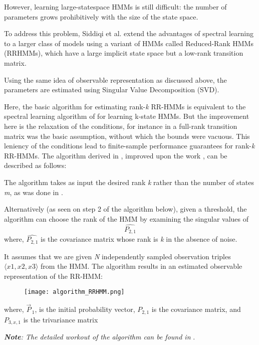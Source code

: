 However, learning large-statespace HMMs is still difficult: the number of parameters
grows prohibitively with the size of the state space.

To address this problem, Siddiqi et al.\cite{ref7} extend the advantages of spectral
learning to a larger class of models using a variant of HMMs called Reduced-Rank HMMs (RRHMMs), which have a large implicit state space but a low-rank transition matrix.

Using the same idea of observable representation as discussed above, the parameters are estimated using Singular Value Decomposition (SVD).

Here, the basic algorithm for estimating rank-\textit{k} RR-HMMs is
equivalent to the spectral learning algorithm of \cite{ref2} for learning k-state HMMs. But the improvement here is the relaxation of the conditions, for instance in \cite{ref2} a full-rank transition matrix was the basic assumption, without which the bounds were vacuous. This leniency of the conditions lead to finite-sample performance guarantees for rank-\textit{k} RR-HMMs.
\newline
\newline
The algorithm derived in \cite{ref7}, improved upon the work \cite{ref2}, can be described as follows:

The algorithm takes as input the desired rank \textit{k}
rather than the number of states \textit{m}, as was done in \cite{ref2}.

Alternatively (as seen on step 2 of the algorithm below), given a threshold, the algorithm can choose the rank of the HMM by examining the singular values of \[\widehat{{P}_{2,1}}\]
 \quad where, $ \widehat{{P}_{2,1}} $ is the covariance matrix whose rank is \textit{k} in the absence of noise. 

It assumes that we are given \textit{N} independently sampled
observation triples $\langle x1, x2, x3\rangle$ from the HMM. 
The algorithm results in an estimated observable representation of the RR-HMM:
\newline
\begin{figure}[h]
    \centering
    \texttt{[image: algorithm\_RRHMM.png]}        
\end{figure}

where, ${\vec{P}_{\,1}}$, is the initial probability vector,
$ {P}_{2,1} $ is the covariance matrix, and
$ {P}_{3,x,1} $ is the trivariance matrix

\textit{\textbf{Note}: The detailed workout of the algorithm can be found in} \cite{ref7}.


